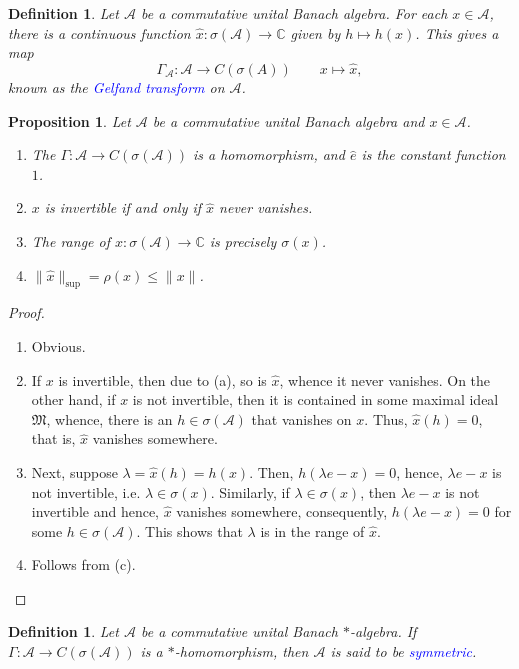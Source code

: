 \documentclass[12pt]{article}
\theoremstyle{thmstyle}
\newtheorem{proposition}[theorem]{Proposition}
\theoremstyle{defstyle}
\newtheorem{definition}[theorem]{Definition}
\newcommand{\bbC}{\mathbb{C}}
\newcommand{\calA}{\mathcal{A}} %
\newcommand{\frakM}{\mathfrak{M}} %
\newcommand{\wh}[1]{\widehat{#1}}
\newcommand{\define}[1]{\textcolor{blue}{\textit{#1}}}
\renewcommand{\le}{\leqslant}
\begin{document}
\begin{definition}
    Let $\calA$ be a commutative unital Banach algebra. For each $x\in\calA$, there is a continuous function $\wh x: \sigma(\calA)\to\bbC$ given by $h\mapsto h(x)$. This gives a map 
    \begin{equation*}
    \Gamma_\calA: \calA\to C(\sigma(A))\qquad x\mapsto\wh x,
    \end{equation*}
    known as the \define{Gelfand transform} on $\calA$.
\end{definition}

\begin{proposition}
    Let $\calA$ be a commutative unital Banach algebra and $x\in\calA$. 
    \begin{enumerate}[label=(\alph*)]
    \item The $\Gamma:\calA\to C(\sigma(\calA))$ is a homomorphism, and $\wh e$ is the constant function $1$. 
    \item $x$ is invertible if and only if $\wh x$ never vanishes. 
    \item The range of $\wh x: \sigma(\calA)\to\bbC$ is precisely $\sigma(x)$.
    \item $\|\wh x\|_{\sup} = \rho(x)\le\|x\|$.
    \end{enumerate}
\end{proposition}
\begin{proof}
\begin{enumerate}[label=(\alph*)]
\item Obvious.
\item If $x$ is invertible, then due to (a), so is $\wh x$, whence it never vanishes. On the other hand, if $x$ is not invertible, then it is contained in some maximal ideal $\frakM$, whence, there is an $h\in\sigma(\calA)$ that vanishes on $x$. Thus, $\wh x(h) = 0$, that is, $\wh x$ vanishes somewhere. 
\item Next, suppose $\lambda = \wh x(h) = h(x)$. Then, $h(\lambda e - x) = 0$, hence, $\lambda e - x$ is not invertible, i.e. $\lambda\in\sigma(x)$. Similarly, if $\lambda\in\sigma(x)$, then $\lambda e - x$ is not invertible and hence, $\wh x$ vanishes somewhere, consequently, $h(\lambda e - x) = 0$ for some $h\in\sigma(\calA)$. This shows that $\lambda$ is in the range of $\wh x$.
\item Follows from (c). \qedhere
\end{enumerate}
\end{proof}

\begin{definition}
    Let $\calA$ be a commutative unital Banach $\ast$-algebra. If $\Gamma:\calA\to C(\sigma(\calA))$ is a $\ast$-homomorphism, then $\calA$ is said to be \define{symmetric}.
\end{definition}
\end{document}
